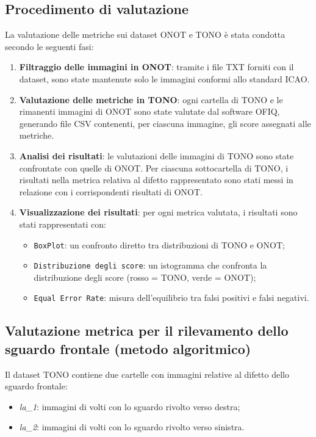 \documentclass[12pt,a4paper,openright,twoside]{book}
\begin{document}
\subsection{Procedimento di valutazione}
La valutazione delle metriche sui dataset ONOT e TONO è stata condotta secondo le seguenti fasi:
\begin{enumerate}
    \item \textbf{Filtraggio delle immagini in ONOT}: tramite i file TXT forniti con il dataset, sono state mantenute solo le immagini conformi allo standard ICAO.
    \item \textbf{Valutazione delle metriche in TONO}: ogni cartella di TONO e le rimanenti immagini di ONOT sono state valutate dal software OFIQ, generando file CSV contenenti, per ciascuna immagine, gli score assegnati alle metriche.
    \item \textbf{Analisi dei risultati}: le valutazioni delle immagini di TONO sono state confrontate con quelle di ONOT. Per ciascuna sottocartella di TONO, i risultati nella metrica relativa al difetto rappresentato sono stati messi in relazione con i corrispondenti risultati di ONOT.
    \item \textbf{Visualizzazione dei risultati}: per ogni metrica valutata, i risultati sono stati rappresentati con:
    \begin{itemize}
        \item \texttt{BoxPlot}: un confronto diretto tra distribuzioni di TONO e ONOT;
        \item \texttt{Distribuzione degli score}: un istogramma che confronta la distribuzione degli score (rosso = TONO, verde = ONOT);
        \item \texttt{Equal Error Rate}: misura dell'equilibrio tra falsi positivi e falsi negativi.
    \end{itemize}
\end{enumerate}

\subsection{Valutazione metrica per il rilevamento dello sguardo frontale (metodo algoritmico)}
Il dataset TONO contiene due cartelle con immagini relative al difetto dello sguardo frontale:
\begin{itemize}
    \item \textit{la\_1}: immagini di volti con lo sguardo rivolto verso destra;
    \item \textit{la\_2}: immagini di volti con lo sguardo rivolto verso sinistra.
\end{itemize}
\end{document}

